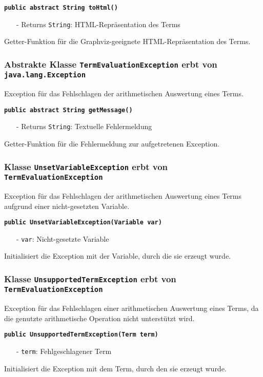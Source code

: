 \documentclass[parskip=full,11pt,twoside]{scrartcl}
\begin{document}
\textbf{\texttt{public abstract String toHtml()}}
\begin{itemize}[noitemsep]
	\item[-] Returns \texttt{String}: HTML-Repräsentation des Terms
\end{itemize}
Getter-Funktion für die Graphviz-geeignete HTML-Repräsentation des Terms.

\subsubsection{Abstrakte Klasse \texttt{TermEvaluationException} erbt von\\\texttt{java.lang.Exception}}
Exception für das Fehlschlagen der arithmetischen Auswertung eines Terms.

\textbf{\texttt{public abstract String getMessage()}}
\begin{itemize}[noitemsep]
	\item[-] Returns \texttt{String}: Textuelle Fehlermeldung
\end{itemize}
Getter-Funktion für die Fehlermeldung zur aufgetretenen Exception.

\subsubsection{Klasse \texttt{UnsetVariableException} erbt von\\\texttt{TermEvaluationException}}
Exception für das Fehlschlagen der arithmetischen Auswertung eines Terms aufgrund einer nicht-gesetzten Variable.

\textbf{\texttt{public UnsetVariableException(Variable var)}}
\begin{itemize}[noitemsep]
	\item[-] \texttt{var}: Nicht-gesetzte Variable
\end{itemize}
Initialisiert die Exception mit der Variable, durch die sie erzeugt wurde.

\subsubsection{Klasse \texttt{UnsupportedTermException} erbt von\\\texttt{TermEvaluationException}}
Exception für das Fehlschlagen einer arithmetischen Auswertung eines Terms, da die genutzte arithmetische Operation nicht unterstützt wird.

\textbf{\texttt{public UnsupportedTermException(Term term)}}
\begin{itemize}[noitemsep]
	\item[-] \texttt{term}: Fehlgeschlagener Term
\end{itemize}
Initialisiert die Exception mit dem Term, durch den sie erzeugt wurde.
\end{document}
